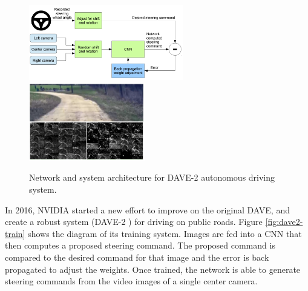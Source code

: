 \documentclass[twoside]{article}
\begin{document}
\begin{figure}[!htp]
\centering
{}
{\includegraphics[width=0.6\textwidth]{img/DAVE2_system.png}}%
\hfill
{}
{\includegraphics[width=0.45\textwidth]{img/DAVE2_road.png}}
\caption{Network and system architecture for DAVE-2\cite{bojarski2016end} autonomous driving system.}
\label{fig:dave}
\end{figure}


In 2016, NVIDIA started a new effort to improve on the original DAVE, and create a robust system (DAVE-2 \cite{bojarski2016end}) for driving on public roads. Figure \ref{fig:dave2-train} shows the diagram of its training system. Images are fed into a CNN that then computes a proposed steering command. The proposed command is compared to the desired command for that image and the error is back propagated  to adjust the weights. Once trained, the network is able to generate steering commands from the video images of a single center camera.
\end{document}
